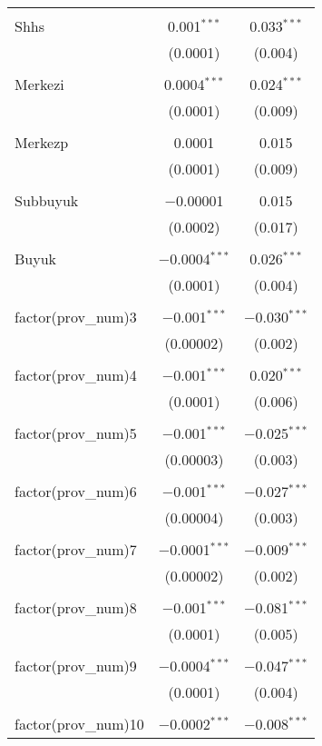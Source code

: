 \begin{table}[!htbp]
\begin{tabular}{@{\extracolsep{5pt}}lcc}
  & & \\ 
 Shhs & 0.001$^{***}$ & 0.033$^{***}$ \\ 
  & (0.0001) & (0.004) \\ 
  & & \\ 
 Merkezi & 0.0004$^{***}$ & 0.024$^{***}$ \\ 
  & (0.0001) & (0.009) \\ 
  & & \\ 
 Merkezp & 0.0001 & 0.015 \\ 
  & (0.0001) & (0.009) \\ 
  & & \\ 
 Subbuyuk & $-$0.00001 & 0.015 \\ 
  & (0.0002) & (0.017) \\ 
  & & \\ 
 Buyuk & $-$0.0004$^{***}$ & 0.026$^{***}$ \\ 
  & (0.0001) & (0.004) \\ 
  & & \\ 
 factor(prov\_num)3 & $-$0.001$^{***}$ & $-$0.030$^{***}$ \\ 
  & (0.00002) & (0.002) \\ 
  & & \\ 
 factor(prov\_num)4 & $-$0.001$^{***}$ & 0.020$^{***}$ \\ 
  & (0.0001) & (0.006) \\ 
  & & \\ 
 factor(prov\_num)5 & $-$0.001$^{***}$ & $-$0.025$^{***}$ \\ 
  & (0.00003) & (0.003) \\ 
  & & \\ 
 factor(prov\_num)6 & $-$0.001$^{***}$ & $-$0.027$^{***}$ \\ 
  & (0.00004) & (0.003) \\ 
  & & \\ 
 factor(prov\_num)7 & $-$0.0001$^{***}$ & $-$0.009$^{***}$ \\ 
  & (0.00002) & (0.002) \\ 
  & & \\ 
 factor(prov\_num)8 & $-$0.001$^{***}$ & $-$0.081$^{***}$ \\ 
  & (0.0001) & (0.005) \\ 
  & & \\ 
 factor(prov\_num)9 & $-$0.0004$^{***}$ & $-$0.047$^{***}$ \\ 
  & (0.0001) & (0.004) \\ 
  & & \\ 
 factor(prov\_num)10 & $-$0.0002$^{***}$ & $-$0.008$^{***}$ \\ 

\end{tabular}
\end{table}
